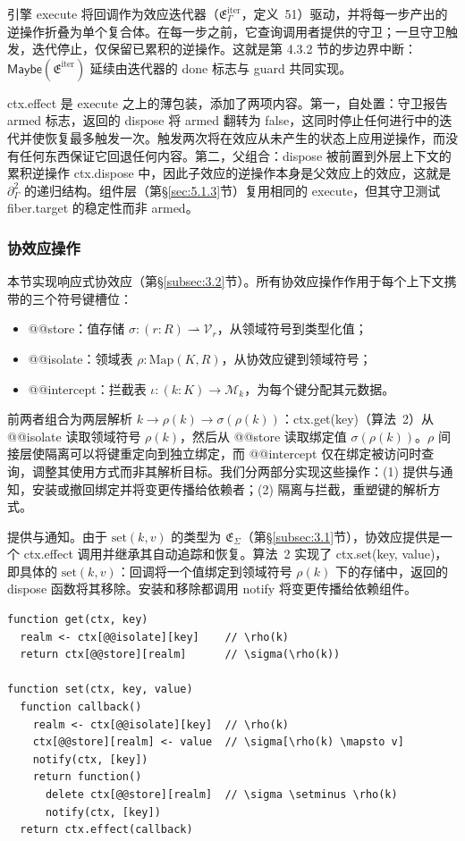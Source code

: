 引擎 execute 将回调作为效应迭代器（$\mathfrak{E}_\Gamma^{\mathrm{iter}}$，定义~51）驱动，并将每一步产出的逆操作折叠为单个复合体。在每一步之前，它查询调用者提供的守卫；一旦守卫触发，迭代停止，仅保留已累积的逆操作。这就是第 4.3.2 节的步边界中断：$\mathsf{Maybe}(\mathfrak{E}^{\mathrm{iter}})$ 延续由迭代器的 done 标志与 guard 共同实现。

ctx.effect 是 execute 之上的薄包装，添加了两项内容。第一，自处置：守卫报告 armed 标志，返回的 dispose 将 armed 翻转为 false，这同时停止任何进行中的迭代并使恢复最多触发一次。触发两次将在效应从未产生的状态上应用逆操作，而没有任何东西保证它回退任何内容。第二，父组合：dispose 被前置到外层上下文的累积逆操作 ctx.dispose 中，因此子效应的逆操作本身是父效应上的效应，这就是 $\partial_\Gamma^2$ 的递归结构。组件层（第\S\ref{sec:5.1.3}节）复用相同的 execute，但其守卫测试 fiber.target 的稳定性而非 armed。

\subsubsection{协效应操作}\label{sec:5.1.2}

本节实现响应式协效应（第\S\ref{subsec:3.2}节）。所有协效应操作作用于每个上下文携带的三个符号键槽位：
\begin{itemize}
\item @@store：值存储 $\sigma : (r : R) \rightharpoonup \mathcal{V}_r$，从领域符号到类型化值；
\item @@isolate：领域表 $\rho : \mathrm{Map}(K, R)$，从协效应键到领域符号；
\item @@intercept：拦截表 $\iota : (k : K) \to \mathcal{M}_k$，为每个键分配其元数据。
\end{itemize}
前两者组合为两层解析 $k \to \rho(k) \to \sigma(\rho(k))$：ctx.get(key)（算法~2）从 @@isolate 读取领域符号 $\rho(k)$，然后从 @@store 读取绑定值 $\sigma(\rho(k))$。$\rho$ 间接层使隔离可以将键重定向到独立绑定，而 @@intercept 仅在绑定被访问时查询，调整其使用方式而非其解析目标。我们分两部分实现这些操作：(1) 提供与通知，安装或撤回绑定并将变更传播给依赖者；(2) 隔离与拦截，重塑键的解析方式。

提供与通知。由于 $\mathrm{set}(k, v)$ 的类型为 $\mathfrak{E}_\Sigma$（第\S\ref{subsec:3.1}节），协效应提供是一个 ctx.effect 调用并继承其自动追踪和恢复。算法~2 实现了 ctx.set(key, value)，即具体的 $\mathrm{set}(k, v)$：回调将一个值绑定到领域符号 $\rho(k)$ 下的存储中，返回的 dispose 函数将其移除。安装和移除都调用 notify 将变更传播给依赖组件。

\begin{lstlisting}[caption={协效应操作}]
function get(ctx, key)
  realm <- ctx[@@isolate][key]    // \rho(k)
  return ctx[@@store][realm]      // \sigma(\rho(k))

function set(ctx, key, value)
  function callback()
    realm <- ctx[@@isolate][key]  // \rho(k)
    ctx[@@store][realm] <- value  // \sigma[\rho(k) \mapsto v]
    notify(ctx, [key])
    return function()
      delete ctx[@@store][realm]  // \sigma \setminus \rho(k)
      notify(ctx, [key])
  return ctx.effect(callback)
\end{lstlisting}

